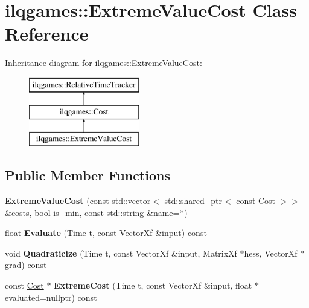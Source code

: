 \hypertarget{classilqgames_1_1_extreme_value_cost}{}\section{ilqgames\+:\+:Extreme\+Value\+Cost Class Reference}
\label{classilqgames_1_1_extreme_value_cost}
Inheritance diagram for ilqgames\+:\+:Extreme\+Value\+Cost\+:\begin{figure}[H]
\begin{center}
\leavevmode
\includegraphics[height=3.000000cm]{classilqgames_1_1_extreme_value_cost}
\end{center}
\end{figure}
\subsection*{Public Member Functions}
\begin{DoxyCompactItemize}
\item 
{\bfseries Extreme\+Value\+Cost} (const std\+::vector$<$ std\+::shared\+\_\+ptr$<$ const \hyperlink{classilqgames_1_1_cost}{Cost} $>$$>$ \&costs, bool is\+\_\+min, const std\+::string \&name=\char`\"{}\char`\"{})\hypertarget{classilqgames_1_1_extreme_value_cost_abfc02bd3700be88b9ac3370d17e1aa78}{}\label{classilqgames_1_1_extreme_value_cost_abfc02bd3700be88b9ac3370d17e1aa78}

\item 
float {\bfseries Evaluate} (Time t, const Vector\+Xf \&input) const \hypertarget{classilqgames_1_1_extreme_value_cost_a90b48a84e25ad4f4c165b6badfb987ba}{}\label{classilqgames_1_1_extreme_value_cost_a90b48a84e25ad4f4c165b6badfb987ba}

\item 
void {\bfseries Quadraticize} (Time t, const Vector\+Xf \&input, Matrix\+Xf $\ast$hess, Vector\+Xf $\ast$grad) const \hypertarget{classilqgames_1_1_extreme_value_cost_ae248e63aededf45ef64481c8174abf53}{}\label{classilqgames_1_1_extreme_value_cost_ae248e63aededf45ef64481c8174abf53}

\item 
const \hyperlink{classilqgames_1_1_cost}{Cost} $\ast$ {\bfseries Extreme\+Cost} (Time t, const Vector\+Xf \&input, float $\ast$evaluated=nullptr) const \hypertarget{classilqgames_1_1_extreme_value_cost_a20c6e9104fb7a84d86828f3204e8d248}{}\label{classilqgames_1_1_extreme_value_cost_a20c6e9104fb7a84d86828f3204e8d248}

\end{DoxyCompactItemize}
